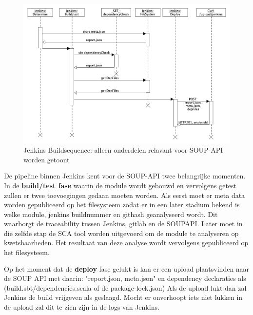 \begin{figure}[bth]
    \myfloatalign
    \includegraphics[width=15cm]{gfx/umlet/exports/jenkinsBuildSequence}
    \caption{Jenkins Buildsequence: alleen onderdelen relavant voor SOUP-API worden getoont}
    \label{fig:JenkinsSequece}
\end{figure}

De pipeline binnen Jenkins kent voor de SOUP-API twee belangrijke momenten. In de \textbf{build/test fase} waarin de module wordt gebouwd en vervolgens getest zullen er twee toevoegingen gedaan moeten worden. Als eerst moet er meta data worden gepubliceerd op het filesysteem zodat er in een later stadium bekend is welke module, jenkins buildnummer en githash geanalyseerd wordt. Dit waarborgt de traceability tussen Jenkins, gitlab en de SOUPAPI. Later moet in die zelfde stap de SCA tool worden uitgevoerd om de module te analyseren op kwetsbaarheden. Het resultaat van deze analyse wordt vervolgens gepubliceerd op het filesysteem.

Op het moment dat de \textbf{deploy} fase gelukt is kan er een upload plaatsvinden naar de SOUP API met daarin: "report.json, meta.json" en dependency declaraties als (build.sbt/dependencies.scala of de package-lock.json)
Als de upload lukt dan zal Jenkins de build vrijgeven als geslaagd. Mocht er onverhoopt iets niet lukken in de upload zal dit te zien zijn in de logs van Jenkins.

